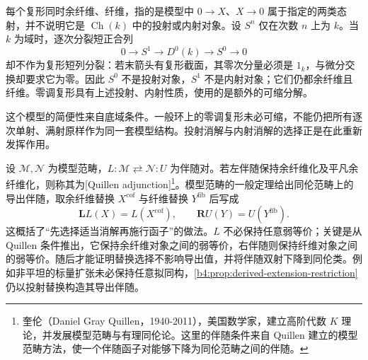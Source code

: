 每个复形同时余纤维、纤维，指的是模型中 \(0\to X\)、\(X\to0\) 属于指定的两类态射，并不说明它是 \(\operatorname{Ch}(k)\) 中的投射或内射对象。设 \(S^n\) 仅在次数 \(n\) 上为 \(k\)。当 \(k\) 为域时，逐次分裂短正合列
\[
	0\longrightarrow S^1\longrightarrow D^0(k) \longrightarrow S^0\longrightarrow0
\]
却不作为复形短列分裂：若末箭头有复形截面，其零次分量必须是 \(1_k\)，与微分交换却要求它为零。因此 \(S^0\) 不是投射对象，\(S^1\) 不是内射对象；它们仍都余纤维且纤维。零调复形具有上述投射、内射性质，使用的是额外的可缩分解。

\ProseParagraphBreak
这个模型的简便性来自底域条件。一般环上的零调复形未必可缩，不能仍把所有逐次单射、满射原样作为同一套模型结构。投射消解与内射消解的选择正是在此重新发挥作用。

\ProseParagraphBreak
设 \(\mathcal M,\mathcal N\) 为模型范畴，\(L:\mathcal M\rightleftarrows\mathcal N:U\) 为伴随对。若左伴随保持余纤维化及平凡余纤维化，则称其为[Quillen adjunction]\footnote{奎伦（Daniel Gray Quillen，1940-2011），美国数学家，建立高阶代数 $K$ 理论，并发展模型范畴与有理同伦论。这里的伴随条件来自 Quillen 建立的模型范畴方法，使一个伴随函子对能够下降为同伦范畴之间的伴随。}。模型范畴的一般定理给出同伦范畴上的导出伴随，取余纤维替换 \(X^{\mathrm{cof}}\) 与纤维替换 \(Y^{\mathrm{fib}}\) 后写成
\[
	\mathbf L L(X)=L(X^{\mathrm{cof}}),\qquad \mathbf R U(Y)=U(Y^{\mathrm{fib}}).
\]
这概括了“先选择适当消解再施行函子”的做法。\(L\) 不必保持任意弱等价；关键是从 Quillen 条件推出，它保持余纤维对象之间的弱等价，右伴随则保持纤维对象之间的弱等价。随后才能证明替换选择不影响导出值，并将伴随双射下降到同伦类。例如非平坦的标量扩张未必保持任意拟同构，\cref{b4:prop:derived-extension-restriction}仍以投射替换构造其导出伴随。

